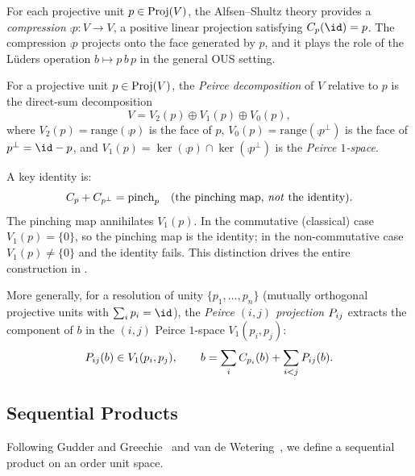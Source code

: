 \documentclass[11pt]{article}
\begin{document}
For each projective unit $p \in \mathrm{Proj}(V)$, the Alfsen--Shultz theory
provides a \emph{compression} $\comp{p} : V \to V$, a positive linear
projection satisfying $\comp{p}(\id) = p$.  The compression $\comp{p}$
projects onto the face generated by $p$, and it plays the role of the
L\"uders operation $b \mapsto p\, b\, p$ in the general OUS setting.

\begin{definition}\label{def:peirce}
  For a projective unit $p \in \mathrm{Proj}(V)$, the \emph{Peirce
  decomposition} of $V$ relative to $p$ is the direct-sum
  decomposition
  \begin{equation}\label{eq:peirce}
    V = V_{2}(p) \oplus V_{1}(p) \oplus V_{0}(p),
  \end{equation}
  where $V_{2}(p) = \mathrm{range}(\comp{p})$ is the face of $p$,
  $V_{0}(p) = \mathrm{range}(\comp{p^{\perp}})$ is the face of
  $p^{\perp} = \id - p$, and
  $V_{1}(p) = \ker(\comp{p}) \cap \ker(\comp{p^{\perp}})$ is the
  \emph{Peirce $1$-space}.
\end{definition}

A key identity is:
\begin{equation}\label{eq:pinching}
  C_{p} + C_{p^{\perp}} = \mathrm{pinch}_{p}
  \quad (\text{the pinching map, \emph{not} the identity}).
\end{equation}
The pinching map annihilates $V_{1}(p)$.  In the commutative
(classical) case $V_{1}(p) = \{0\}$, so the pinching map is the
identity; in the non-commutative case $V_{1}(p) \neq \{0\}$ and the
identity fails.  This distinction drives the entire construction in
.

More generally, for a resolution of unity
$\{p_{1}, \ldots, p_{n}\}$ (mutually orthogonal projective units with
$\sum_{i} p_{i} = \id$), the \emph{Peirce $(i,j)$ projection}
$P_{ij}$ extracts the component of $b$ in the $(i,j)$ Peirce
$1$-space $V_{1}(p_{i}, p_{j})$:
\begin{equation}\label{eq:peirce-proj}
  P_{ij}(b) \in V_{1}(p_{i}, p_{j}),
  \qquad
  b = \sum_{i} C_{p_{i}}(b) + \sum_{i < j} P_{ij}(b).
\end{equation}


\subsection{Sequential Products}
\label{sec:sp-axioms}

Following Gudder and Greechie~\cite{GudderGreechie2002} and van de
Wetering~\cite{vandeWetering2019b}, we define a sequential product on
an order unit space.
\end{document}
